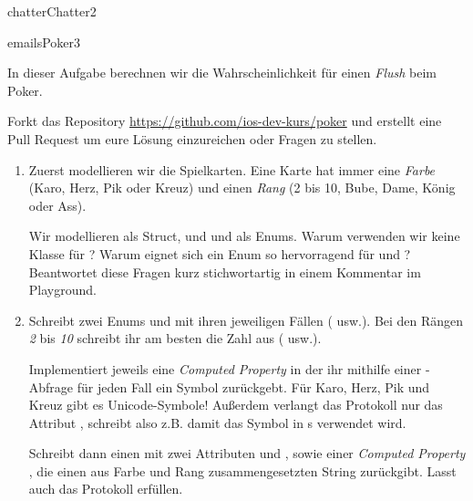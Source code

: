 \documentclass[parskip=half, final]{scrreprt}
\begin{document}
\begin{lecture}
\begin{exc}
\begin{excitem}{chatter}{Chatter}{2}
\begin{enumerate}[label=\roman*.]
\end{enumerate}

\end{excitem}


\begin{excitem}{emails}{Poker}{3}

In dieser Aufgabe berechnen wir die Wahrscheinlichkeit für einen \emph{Flush} beim Poker.

Forkt das Repository \url{https://github.com/ios-dev-kurs/poker} und erstellt eine Pull Request um eure Lösung einzureichen oder Fragen zu stellen.

\begin{enumerate}[label=\roman*.]

\item Zuerst modellieren wir die Spielkarten. Eine Karte  hat immer eine \emph{Farbe}  (Karo, Herz, Pik oder Kreuz) und einen \emph{Rang}  (2 bis 10, Bube, Dame, König oder Ass).

Wir modellieren  als Struct, und  und  als Enums. Warum verwenden wir keine Klasse für ? Warum eignet sich ein Enum so hervorragend für  und ? Beantwortet diese Fragen kurz stichwortartig in einem Kommentar im Playground.

\item Schreibt zwei Enums  und  mit ihren jeweiligen Fällen ( usw.). Bei den Rängen \emph{2} bis \emph{10} schreibt ihr am besten die Zahl aus ( usw.).

Implementiert jeweils eine \emph{Computed Property}  in der ihr mithilfe einer -Abfrage für jeden Fall ein Symbol zurückgebt.  Für Karo, Herz, Pik und Kreuz gibt es Unicode-Symbole! Außerdem verlangt das Protokoll  nur das Attribut , schreibt also z.B.  damit das Symbol in s verwendet wird.
	
Schreibt dann einen  mit zwei Attributen  und , sowie einer \emph{Computed Property} , die einen aus Farbe und Rang zusammengesetzten String zurückgibt. Lasst auch  das  Protokoll erfüllen.
		

\end{enumerate}
\end{excitem}
\end{exc}
\end{lecture}
\end{document}
